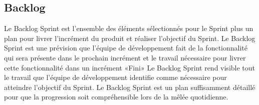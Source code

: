 \subsection{Backlog}

Le Backlog Sprint est l’ensemble des éléments sélectionnés pour le Sprint plus un plan pour livrer l’incrément du produit et réaliser l’objectif du Sprint. Le Backlog Sprint est une prévision que l’équipe de développement fait de la fonctionnalité qui sera présente dans le prochain incrément et le travail nécessaire pour livrer cette fonctionnalité dans un incrément 
«Fini»
Le Backlog Sprint rend visible tout le travail que l'équipe de développement identifie comme nécessaire pour atteindre l'objectif du Sprint.
Le Backlog Sprint est un plan suffisamment détaillé pour que la progression soit compréhensible lors de la mêlée quotidienne.



